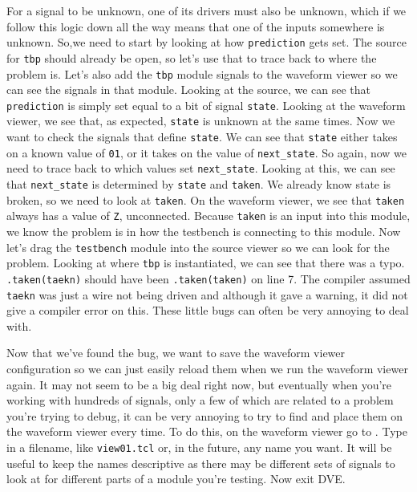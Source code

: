 \documentclass[dvipsnames]{article}
\begin{document}
For a signal to be unknown, one of its drivers must also be unknown, which if we
follow this logic down all the way means that one of the inputs somewhere is
unknown. So,we need to start by looking at how \texttt{prediction} gets set. The 
source for \texttt{tbp} should already be open, so let's use that to trace back 
to where the problem is. Let's also add the \texttt{tbp} module signals to the
waveform viewer so we can see the signals in that module. Looking at the source,
we can see that \texttt{prediction} is simply set equal to a bit of signal
\texttt{state}. Looking at the waveform viewer, we see that, as expected,
\texttt{state} is unknown at the same times. Now we want to check the signals 
that define \texttt{state}. We can see that \texttt{state} either takes on a 
known value of \texttt{01}, or it takes on the value of \texttt{next\_state}. 
So again, now we need to trace back to which values set \texttt{next\_state}.
Looking at this, we can see that \texttt{next\_state} is determined by
\texttt{state} and \texttt{taken}. We already know state is broken, so we need 
to look at \texttt{taken}. On the waveform viewer, we see that \texttt{taken}
always has a value of \texttt{Z}, unconnected. Because \texttt{taken} is an 
input into this module, we know the problem is in how the testbench is 
connecting to this module. Now let's drag the \texttt{testbench} module into the
source viewer so we can look for the problem. Looking at where \texttt{tbp} is 
instantiated, we can see that there was a typo. \texttt{.taken(taekn)} should 
have been \texttt{.taken(taken)} on line 7. The compiler assumed \texttt{taekn}
was just a wire not being driven and although it gave a warning, it did not give
a compiler error on this. These little bugs can often be very annoying to deal
with.

Now that we've found the bug, we want to save the waveform viewer configuration
so we can just easily reload them when we run the waveform viewer again. It may
not seem to be a big deal right now, but eventually when you're working with 
hundreds of signals, only a few of which are related to a problem you're trying
to debug, it can be very annoying to try to find and place them on the waveform
viewer every time. To do this, on the waveform viewer go to . Type in a filename, like \texttt{view01.tcl} or, in the future, any 
name you want. It will be useful to keep the names descriptive as there may be 
different sets of signals to look at for different parts of a module you're 
testing. Now exit DVE.
\end{document}
